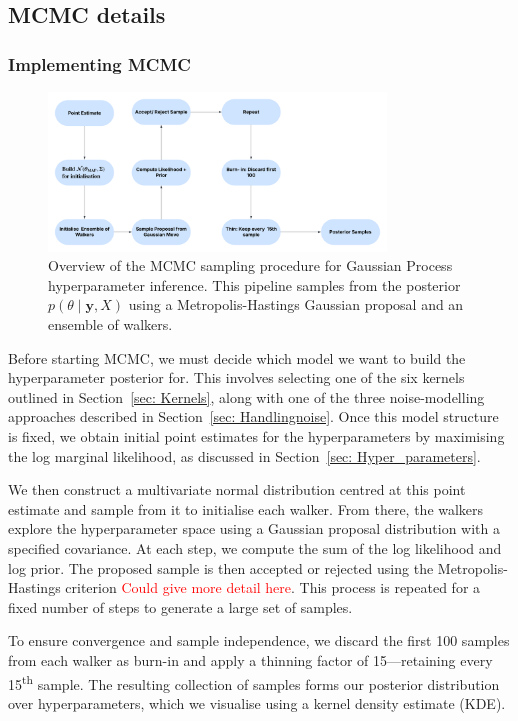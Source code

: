 \documentclass{ucdgradtaughtthesis}
\begin{document}
\subsection{MCMC details}
\subsubsection*{Implementing MCMC}
\begin{figure}[H]
    \centering
    \includegraphics[width=0.8\textwidth]{LatexPlots/MCMC_Flow.png}
    \caption{Overview of the MCMC sampling procedure for Gaussian Process hyperparameter inference.
     This pipeline samples from the posterior \( p(\theta \mid \mathbf{y}, X) \) using a Metropolis-Hastings Gaussian proposal and an ensemble of walkers.}
    \label{fig:MCMC flowchart}
\end{figure}

\noindent
Before starting MCMC, we must decide which model we want to build the hyperparameter posterior for. This involves selecting one of the six kernels outlined in Section~\ref{sec: Kernels}, along with one of the three noise-modelling approaches described in Section~\ref{sec: Handlingnoise}. Once this model structure is fixed, we obtain initial point estimates for the hyperparameters by maximising the log marginal likelihood, as discussed in Section~\ref{sec: Hyper_parameters}.

\noindent
We then construct a multivariate normal distribution centred at this point estimate and sample from it to initialise each walker. From there, the walkers explore the hyperparameter space using a Gaussian proposal distribution with a specified covariance. At each step, we compute the sum of the log likelihood and log prior. The proposed sample is then accepted or rejected using the Metropolis-Hastings criterion \textcolor{red}{Could give more detail here}. This process is repeated for a fixed number of steps to generate a large set of samples.

\noindent
To ensure convergence and sample independence, we discard the first 100 samples from each walker as burn-in and apply a thinning factor of 15—retaining every 15\textsuperscript{th} sample. The resulting collection of samples forms our posterior distribution over hyperparameters, which we visualise using a kernel density estimate (KDE).
\end{document}
